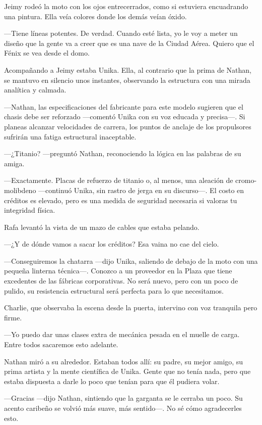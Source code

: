 \documentclass[11pt,twoside]{book}
\begin{document}
Jeimy rodeó la moto con los ojos entrecerrados, como si estuviera encuadrando una pintura. Ella veía colores donde los demás veían óxido.

---Tiene líneas potentes. De verdad. Cuando esté lista, yo le voy a meter un diseño que la gente va a creer que es una nave de la Ciudad Aérea. Quiero que el Fénix se vea desde el domo.

Acompañando a Jeimy estaba Unika. Ella, al contrario que la prima de Nathan, se mantuvo en silencio unos instantes, observando la estructura con una mirada analítica y calmada.

---Nathan, las especificaciones del fabricante para este modelo sugieren que el chasis debe ser reforzado ---comentó Unika con su voz educada y precisa---. Si planeas alcanzar velocidades de carrera, los puntos de anclaje de los propulsores sufrirán una fatiga estructural inaceptable.

 ---¿Titanio? ---preguntó Nathan, reconociendo la lógica en las palabras de su amiga.

 ---Exactamente. Placas de refuerzo de titanio o, al menos, una aleación de cromo-molibdeno ---continuó Unika, sin rastro de jerga en su discurso---. El costo en créditos es elevado, pero es una medida de seguridad necesaria si valoras tu integridad física.

Rafa levantó la vista de un mazo de cables que estaba pelando.

---¿Y de dónde vamos a sacar los créditos? Esa vaina no cae del cielo.

---Conseguiremos la chatarra ---dijo Unika, saliendo de debajo de la moto con una pequeña linterna técnica---. Conozco a un proveedor en la Plaza que tiene excedentes de las fábricas corporativas. No será nuevo, pero con un poco de pulido, su resistencia estructural será perfecta para lo que necesitamos.

Charlie, que observaba la escena desde la puerta, intervino con voz tranquila pero firme.

---Yo puedo dar unas clases extra de mecánica pesada en el muelle de carga. Entre todos sacaremos esto adelante.

Nathan miró a su alrededor. Estaban todos allí: su padre, su mejor amigo, su prima artista y la mente científica de Unika. Gente que no tenía nada, pero que estaba dispuesta a darle lo poco que tenían para que él pudiera volar.

---Gracias ---dijo Nathan, sintiendo que la garganta se le cerraba un poco. Su acento caribeño se volvió más suave, más sentido---. No sé cómo agradecerles esto.
\end{document}
